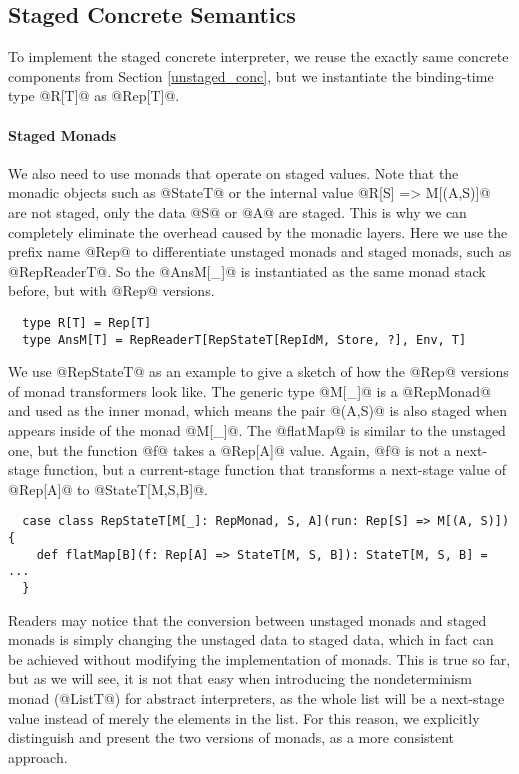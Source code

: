 \subsection{Staged Concrete Semantics}

To implement the staged concrete interpreter, we reuse the exactly same concrete
components from Section \ref{unstaged_conc}, but we instantiate the binding-time
type @R[T]@ as @Rep[T]@.

\paragraph{Staged Monads} We also need to use monads that operate on staged
values. Note that the monadic objects such as @StateT@ or the internal value
@R[S] => M[(A,S)]@ are not staged, only the data @S@ or @A@ are staged.
This is why we can completely eliminate the overhead caused by the monadic layers.
Here we use the prefix name @Rep@ to differentiate unstaged monads and staged
monads, such as @RepReaderT@. So the @AnsM[_]@ is instantiated as the same monad
stack before, but with @Rep@ versions.

\begin{lstlisting}
  type R[T] = Rep[T]
  type AnsM[T] = RepReaderT[RepStateT[RepIdM, Store, ?], Env, T]
\end{lstlisting}

We use @RepStateT@ as an example to give a sketch of how the @Rep@ versions of monad
transformers look like. The generic type @M[_]@ is a @RepMonad@ and used as the
inner monad, which means the pair @(A,S)@ is also staged when appears inside of the monad
@M[_]@. The @flatMap@ is similar to the unstaged one, but the function @f@ takes
a @Rep[A]@ value. Again, @f@ is not a next-stage function, but a current-stage
function that transforms a next-stage value of @Rep[A]@ to @StateT[M,S,B]@.

\begin{lstlisting}
  case class RepStateT[M[_]: RepMonad, S, A](run: Rep[S] => M[(A, S)]) {
    def flatMap[B](f: Rep[A] => StateT[M, S, B]): StateT[M, S, B] = ...
  }
\end{lstlisting}

Readers may notice that the conversion between unstaged monads and staged monads
is simply changing the unstaged data to staged data, which in fact can be
achieved without modifying the implementation of monads. This is true so far, but
as we will see, it is not that easy when introducing the nondeterminism monad
(@ListT@) for abstract interpreters, as the whole list will be a next-stage
value instead of merely the elements in the list. For this reason, we explicitly
distinguish and present the two versions of monads, as a more consistent
approach.

